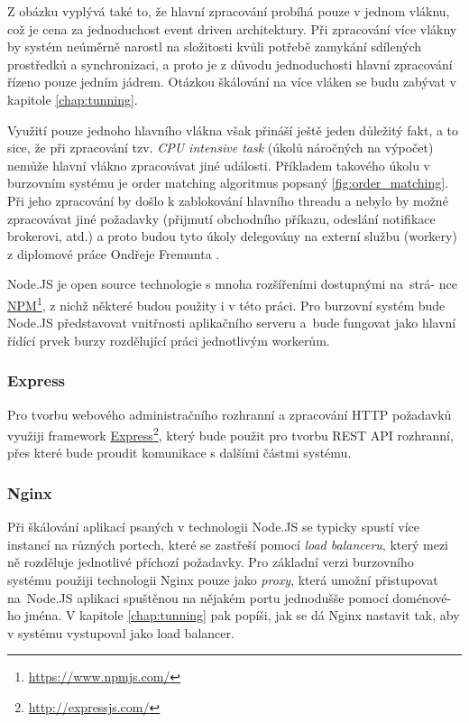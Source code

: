 \documentclass[thesis=M,czech]{FITthesis}[2012/06/26]
\newcommand\fnurl[2]{\href{#2}{#1}\footnote{\url{#2}}}
\begin{document}
	Z obázku vyplývá také to, že hlavní zpracování probíhá pouze v jednom vláknu, což je cena za jednoduchost event driven architektury. Při zpracování více vlákny by systém neúměrně narostl na složitosti kvůli potřebě zamykání sdílených prostředků a synchronizaci, a proto je z důvodu jednoduchosti hlavní zpracování řízeno pouze jedním jádrem. Otázkou škálování na více vláken se budu zabývat v kapitole \ref{chap:tunning}.
	
	Využití pouze jednoho hlavního vlákna však přináší ještě jeden důležitý fakt, a to sice, že při zpracování tzv. \textit{CPU intensive task} (úkolů náročných na výpočet) nemůže hlavní vlákno zpracovávat jiné události. Příkladem takového úkolu v burzovním systému je order matching algoritmus popsaný \ref{fig:order_matching}. Při jeho zpracování by došlo k zablokování hlavního threadu a nebylo by možné zpracovávat jiné požadavky (přijmutí obchodního příkazu, odeslání notifikace brokerovi, atd.) a proto budou tyto úkoly delegovány na externí službu (workery) z diplomové práce Ondřeje Fremunta \cite{Fremunt2014}.
	
	Node.JS je open source technologie s mnoha rozšířeními dostupnými na~strá- nce \fnurl{NPM}{https://www.npmjs.com/}, z nichž některé budou použity i v této práci. Pro burzovní systém bude Node.JS představovat vnitřnosti aplikačního serveru a~bude fungovat jako hlavní řídící prvek burzy rozdělující práci jednotlivým workerům.

\subsubsection{Express}

	Pro tvorbu webového administračního rozhranní a zpracování HTTP požadavků využiji framework \fnurl{Express}{http://expressjs.com/}, který bude použit pro tvorbu REST API rozhranní, přes které bude proudit komunikace s dalšími částmi systému.
	
\subsubsection{Nginx}
	
	Při škálování aplikací psaných v technologii Node.JS se typicky spustí více instancí na různých portech, které se zastřeší pomocí \textit{load balanceru}, který mezi ně rozděluje jednotlivé příchozí požadavky. Pro základní verzi burzovního systému použiji technologii Nginx pouze jako \textit{proxy}, která umožní přistupovat na~Node.JS aplikaci spuštěnou na nějakém portu jednodušše pomocí doménové- ho jména. V kapitole \ref{chap:tunning} pak popíši, jak se dá Nginx nastavit tak, aby v systému vystupoval jako load balancer. 
\end{document}
